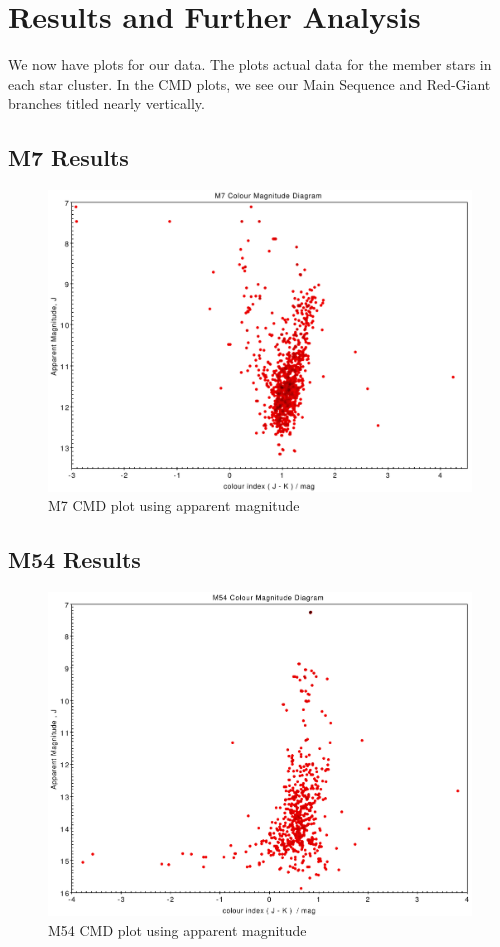 \documentclass[12pt, twocolumn]{aastex62}
\begin{document}
\section{Results and Further Analysis}
We now have plots for our data. The plots actual data for the member stars in each star cluster. In the CMD plots, we see our Main Sequence and Red-Giant branches titled nearly vertically.
	\subsection{M7 Results}
	\begin{figure}
		\includegraphics[scale=0.34]{m7_cmd_apparent}
		\caption{M7 CMD plot using apparent magnitude}
		\label{fig: m7_cmd}
	\end{figure}
	\subsection{M54 Results}
	\begin{figure}
		\includegraphics[scale=0.34]{m54_cmd_apparent}
		\caption{M54 CMD plot using apparent magnitude}
		\label{fig: m54_cmd}
	\end{figure}
\end{document}
